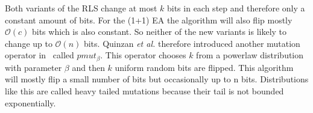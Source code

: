 Both variants of the RLS change at most $k$ bits in each step and therefore only a constant amount of bits.
For the (1+1) EA the algorithm will also flip mostly $\mathcal{O}(c)$ bits which is also constant.
So neither of the new variants is likely to change up to $\mathcal{O}(n)$ bits.
Quinzan \textit{et al.} therefore introduced another mutation operator in~\cite{friedrich2018evolutionary} called $pmut_\beta$.
This operator chooses $k$ from a powerlaw distribution with parameter $\beta$ and then $k$ uniform random bits are flipped.
This algorithm will mostly flip a small number of bits but occasionally up to n bits.
Distributions like this are called heavy tailed mutations because their tail is not bounded exponentially.